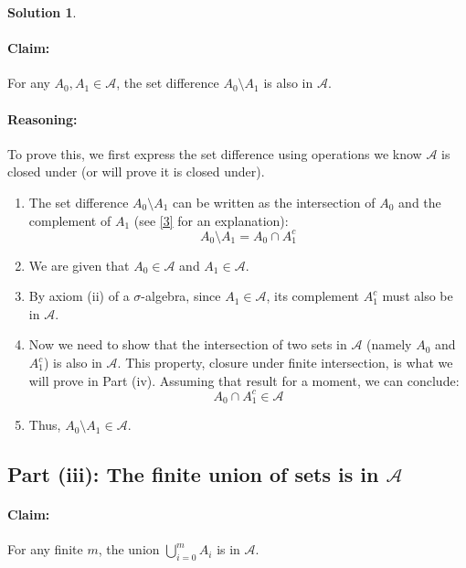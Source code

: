 \documentclass[11pt,a4paper]{article}
\theoremstyle{definition}
\newtheorem*{solution}{Solution}
\begin{document}
\begin{solution}
\paragraph{Claim:} For any $A_0, A_1 \in \mathcal{A}$, the set difference $A_0 \setminus A_1$ is also in $\mathcal{A}$.

\paragraph{Reasoning:}
To prove this, we first express the set difference using operations we know $\mathcal{A}$ is closed under (or will prove it is closed under).
\begin{enumerate}
    \item The set difference $A_0 \setminus A_1$ can be written as the intersection of $A_0$ and the complement of $A_1$ (see \hyperlink{note:set_difference}{[3]} for an explanation):
    \[ A_0 \setminus A_1 = A_0 \cap A_1^c \]
    \item We are given that $A_0 \in \mathcal{A}$ and $A_1 \in \mathcal{A}$.
    \item By axiom (ii) of a $\sigma$-algebra, since $A_1 \in \mathcal{A}$, its complement $A_1^c$ must also be in $\mathcal{A}$.
    \item Now we need to show that the intersection of two sets in $\mathcal{A}$ (namely $A_0$ and $A_1^c$) is also in $\mathcal{A}$. This property, closure under finite intersection, is what we will prove in Part (iv). Assuming that result for a moment, we can conclude:
    \[ A_0 \cap A_1^c \in \mathcal{A} \]
    \item Thus, $A_0 \setminus A_1 \in \mathcal{A}$.
\end{enumerate}

\subsection*{Part (iii): The finite union of sets is in $\mathcal{A}$}

\paragraph{Claim:} For any finite $m$, the union $\bigcup_{i=0}^{m} A_i$ is in $\mathcal{A}$.


\end{solution}
\end{document}
